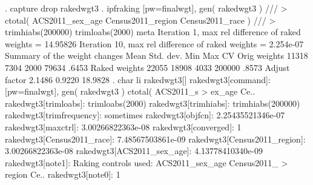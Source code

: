 . capture drop rakedwgt3
{\smallskip}
. ipfraking [pw=finalwgt], gen( rakedwgt3 ) ///
>     ctotal( ACS2011_sex_age Census2011_region Census2011_race ) ///
>     trimhiabs(200000) trimloabs(2000) meta
{\smallskip}
 Iteration 1, max rel difference of raked weights = 14.95826
\oom
 Iteration 10, max rel difference of raked weights = 2.254e-07
{\smallskip}
\cnp
   Summary of the weight changes
{\smallskip}
              {\VBAR}    Mean    Std. dev.    Min        Max       CV
Orig weights  {\VBAR}    11318       7304      2000       79634   .6453
Raked weights {\VBAR}    22055      18908      4033      200000   .8573
Adjust factor {\VBAR}   2.1486               0.9220     18.9828
{\smallskip}
. char li rakedwgt3[]
  rakedwgt3[command]:         [pw=finalwgt], gen( rakedwgt3 ) ctotal( ACS2011_s
> ex_age Ce..
  rakedwgt3[trimloabs]:       trimloabs(2000)
  rakedwgt3[trimhiabs]:       trimhiabs(200000)
  rakedwgt3[trimfrequency]:   sometimes
  rakedwgt3[objfcn]:          2.25435521346e-07
  rakedwgt3[maxctrl]:         3.00266822363e-08
  rakedwgt3[converged]:       1
  rakedwgt3[Census2011_race]: 7.48567503861e-09
  rakedwgt3[Census2011_region]:
                              3.00266822363e-08
  rakedwgt3[ACS2011_sex_age]: 4.13778410340e-09
  rakedwgt3[note1]:           Raking controls used: ACS2011_sex_age Census2011_
> region Ce..
  rakedwgt3[note0]:           1
{\smallskip}
